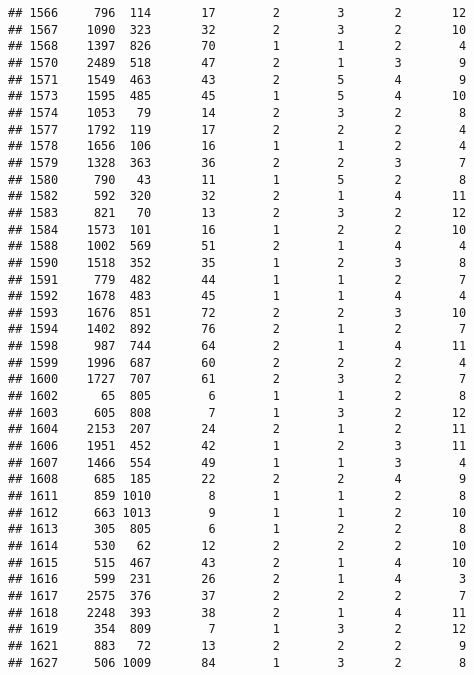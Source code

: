 \documentclass[]{article}
\begin{document}
\begin{verbatim}
## 1566     796  114       17        2        3       2       12
## 1567    1090  323       32        2        3       2       10
## 1568    1397  826       70        1        1       2        4
## 1570    2489  518       47        2        1       3        9
## 1571    1549  463       43        2        5       4        9
## 1573    1595  485       45        1        5       4       10
## 1574    1053   79       14        2        3       2        8
## 1577    1792  119       17        2        2       2        4
## 1578    1656  106       16        1        1       2        4
## 1579    1328  363       36        2        2       3        7
## 1580     790   43       11        1        5       2        8
## 1582     592  320       32        2        1       4       11
## 1583     821   70       13        2        3       2       12
## 1584    1573  101       16        1        2       2       10
## 1588    1002  569       51        2        1       4        4
## 1590    1518  352       35        1        2       3        8
## 1591     779  482       44        1        1       2        7
## 1592    1678  483       45        1        1       4        4
## 1593    1676  851       72        2        2       3       10
## 1594    1402  892       76        2        1       2        7
## 1598     987  744       64        2        1       4       11
## 1599    1996  687       60        2        2       2        4
## 1600    1727  707       61        2        3       2        7
## 1602      65  805        6        1        1       2        8
## 1603     605  808        7        1        3       2       12
## 1604    2153  207       24        2        1       2       11
## 1606    1951  452       42        1        2       3       11
## 1607    1466  554       49        1        1       3        4
## 1608     685  185       22        2        2       4        9
## 1611     859 1010        8        1        1       2        8
## 1612     663 1013        9        1        1       2       10
## 1613     305  805        6        1        2       2        8
## 1614     530   62       12        2        2       2       10
## 1615     515  467       43        2        1       4       10
## 1616     599  231       26        2        1       4        3
## 1617    2575  376       37        2        2       2        7
## 1618    2248  393       38        2        1       4       11
## 1619     354  809        7        1        3       2       12
## 1621     883   72       13        2        2       2        9
## 1627     506 1009       84        1        3       2        8

\end{verbatim}
\end{document}
